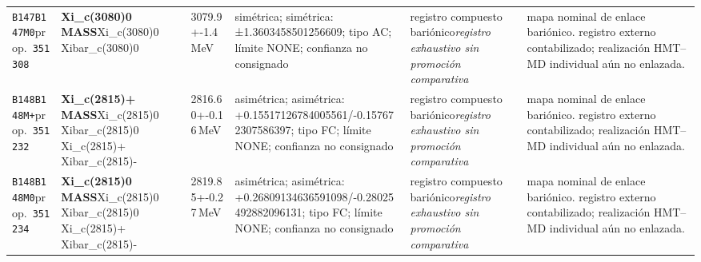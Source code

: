 \begin{landscape}
\begin{longtable}{L{1.85cm}L{4.45cm}L{2.35cm}L{4.05cm}L{3.35cm}L{7.15cm}}
\texttt{B147}\newline \texttt{B147M0}\newline prop.\ \texttt{351308} & \textbf{Xi\_\allowbreak{}c(3080)0 MASS}\newline Xi\_\allowbreak{}c(3080)0 \textbar{}\allowbreak{} Xibar\_\allowbreak{}c(3080)0 & 3079.9+-1.4\,MeV & simétrica; simétrica: ±1.3603458501256609; tipo AC; límite NONE; confianza no consignado & registro compuesto bariónico\newline \emph{registro exhaustivo sin promoción comparativa} & mapa nominal de enlace bariónico. registro externo contabilizado; realización HMT--MD individual aún no enlazada. \\
\texttt{B148}\newline \texttt{B148M+}\newline prop.\ \texttt{351232} & \textbf{Xi\_\allowbreak{}c(2815)+ MASS}\newline Xi\_\allowbreak{}c(2815)0 \textbar{}\allowbreak{} Xibar\_\allowbreak{}c(2815)0 \textbar{}\allowbreak{} Xi\_\allowbreak{}c(2815)+ \textbar{}\allowbreak{} Xibar\_\allowbreak{}c(2815)- & 2816.60+-0.16\,MeV & asimétrica; asimétrica: +0.15517126784005561/-0.157672307586397; tipo FC; límite NONE; confianza no consignado & registro compuesto bariónico\newline \emph{registro exhaustivo sin promoción comparativa} & mapa nominal de enlace bariónico. registro externo contabilizado; realización HMT--MD individual aún no enlazada. \\
\texttt{B148}\newline \texttt{B148M0}\newline prop.\ \texttt{351234} & \textbf{Xi\_\allowbreak{}c(2815)0 MASS}\newline Xi\_\allowbreak{}c(2815)0 \textbar{}\allowbreak{} Xibar\_\allowbreak{}c(2815)0 \textbar{}\allowbreak{} Xi\_\allowbreak{}c(2815)+ \textbar{}\allowbreak{} Xibar\_\allowbreak{}c(2815)- & 2819.85+-0.27\,MeV & asimétrica; asimétrica: +0.26809134636591098/-0.28025492882096131; tipo FC; límite NONE; confianza no consignado & registro compuesto bariónico\newline \emph{registro exhaustivo sin promoción comparativa} & mapa nominal de enlace bariónico. registro externo contabilizado; realización HMT--MD individual aún no enlazada. \\

\end{longtable}
\end{landscape}
